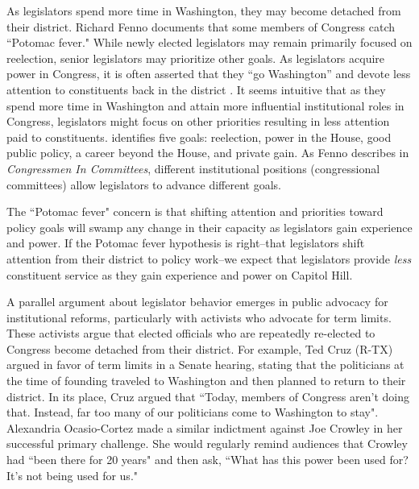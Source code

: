 \documentclass[12pt]{article}
\begin{document}
As legislators spend more time in Washington, they may become detached from their district. Richard Fenno documents that some members of Congress catch ``Potomac fever." While newly elected legislators may remain primarily focused on reelection, senior legislators may prioritize other goals. As legislators acquire power in Congress, it is often asserted that they ``go Washington'' and devote less attention to constituents back in the district \citep{Fenno1978}. It seems intuitive that as they spend more time in Washington and attain more influential institutional roles in Congress, legislators might focus on other priorities resulting in less attention paid to constituents.  \citet{Fenno1973} identifies five goals: reelection, power in the House, good public policy, a career beyond the House, and private gain. As Fenno describes in \textit{Congressmen In Committees}, different institutional positions (congressional committees) allow legislators to advance different goals. %

The ``Potomac fever" concern is that shifting attention and priorities toward policy goals will swamp any change in their capacity as legislators gain experience and power. If the Potomac fever hypothesis is right--that legislators shift attention from their district to policy work--we expect that legislators provide \textit{less} constituent service as they gain experience and power on Capitol Hill. 


A parallel argument about legislator behavior emerges in public advocacy for institutional reforms, particularly with activists who advocate for term limits. These activists argue that elected officials who are repeatedly re-elected to Congress become detached from their district. For example, Ted Cruz (R-TX) argued in favor of term limits in a Senate hearing, stating that the politicians at the time of founding traveled to Washington and then planned to return to their district. In its place, Cruz argued that ``Today, members of Congress aren't doing that. Instead, far too many of our politicians come to Washington to stay". Alexandria Ocasio-Cortez made a similar indictment against Joe Crowley in her successful primary challenge. She would regularly remind audiences that Crowley had ``been there for 20 years" and then ask, ``What has this power been used for? It's not being used for us." %
\end{document}
